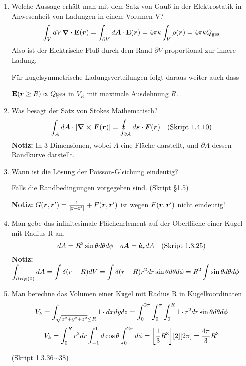 \begin{enumerate}
  \item Welche Aussage erhält man mit dem Satz von Gauß in der %
        Elektrostatik in Anwesenheit von Ladungen in einem Volumen V?
        \begin{equation*}
          \int_V dV \div \vb E(\vb* r) 
          = \int_{\partial V} d\vb* A \cdot \vb E(\vb* r) 
          = 4\pi k \int_V \rho(\vb* r)
          = 4\pi k Q_{\text{ges}}
        \end{equation*}
        Also ist der Elektrische Fluß durch dem Rand $\partial V$ 
        proportional zur innere Ladung.

        Für kugelsymmetrische Ladungsverteilungen folgt daraus weiter auch
        dass 
        \begin{center}
        $\vb E(\vb* r \ge R)\propto Q{\text{ges}}$ in $V_R$ mit maximale
        Ausdehnung $R$.
        \end{center}

  \item Was besagt der Satz von Stokes Mathematisch? %
        $$\displaystyle \int_A d\vb* A \cdot \qty[\curl \vb* F(\vb* r)]=
         \oint_{\partial A}d\vb* s\cdot \vb* F(\vb* r)
         \quad\text{(Skript 1.4.10)}$$
        \textbf{Notiz:} In 3 Dimensionen, wobei $A$ eine Fläche 
        darstellt,
        und $\partial A$ dessen Randkurve darstellt.

  \item Wann ist die Lösung der Poisson-Gleichung eindeutig? %
        \begin{center}
          Falls die Randbedingungen vorgegeben sind. (Skript §1.5)
        \end{center}
        \textbf{Notiz:} $G(\vb* r, \vb* r')=\frac{1}{\abs{\vb{r}-\vb{r}'}} + F(\vb* r, \vb* r')$ 
        ist wegen $F(\vb* r, \vb* r')$ nicht eindeutig!
        
  \item Man gebe das infinitesimale Flächenelement auf der Oberfläche %
        einer Kugel mit Radius R an.
        $$\displaystyle dA = R^2\sin\theta d\theta d\phi
        \quad d\vb* A = \vu e_r dA \quad\text{(Skript 1.3.25)}$$
        \textbf{Notiz:} $\displaystyle\int_{\partial B_R(0)} dA=\int\delta(r-R)dV
         =\int \delta(r-R)r^2dr\sin\theta d\theta d\phi
         =R^2 \int \sin\theta d\theta d\phi$

  \item Man berechne das Volumen einer Kugel mit Radius R %
        in Kugelkoordinaten\\
        $$\displaystyle V_k=\int_{\sqrt{x^2+y^2+z^2}\le R} 1\cdot dxdydz
         =\int_0^{2\pi}\int_0^\pi\int_0^R 1\cdot r^2dr 
          \sin\theta d\theta d\phi$$
        $$\displaystyle V_k=\int_0^R r^2 dr \int_{-1}^{1} d\cos\theta 
                 \int_0^{2\pi}d\phi
         =\qty[\frac{1}{3}R^3]\qty[2]\qty[2\pi]=\frac{4\pi}{3}R^3$$
        \begin{center}
          (Skript 1.3.36$\sim$38)
        \end{center}


\end{enumerate}
